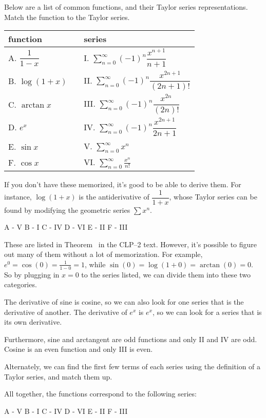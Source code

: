 \begin{Mquestion}
Below are a list of common functions, and their Taylor series representations. Match the function to the Taylor series.
\begin{center}
\begin{tabular}{l c l}
function & \qquad & series\\
\hline
A. $\dfrac{1}{1-x}$&&I. $\displaystyle\sum_{n=0}^\infty(-1)^n\dfrac{x^{n+1}}{n+1}$\\[20pt]
B. $\log(1+x)$&&II. $\displaystyle\sum_{n=0}^\infty(-1)^n\dfrac{x^{2n+1}}{(2n+1)!}$\\[20pt]
C. $\arctan x$&&III. $\displaystyle\sum_{n=0}^\infty(-1)^n\dfrac{x^{2n}}{(2n)!}$\\[20pt]
D. $e^x$&&IV. $\displaystyle\sum_{n=0}^\infty(-1)^n\dfrac{x^{2n+1}}{2n+1}$\\[20pt]
E. $\sin x$ &&V. $\displaystyle\sum_{n=0}^\infty x^n$\\[20pt]
F. $\cos x$ &&VI. $\displaystyle\sum_{n=0}^\infty \frac{x^n}{n!}$
\end{tabular}
\end{center}
\end{Mquestion}
\begin{hint}
If you don't have these memorized, it's good to be able to derive them. For instance, $\log(1+x)$ is the antiderivative of $\dfrac{1}{1+x}$, whose Taylor series can be found by modifying the geometric series $\sum x^n$.
\end{hint}
\begin{answer}
A - V \hfill
B - I \hfill
C - IV \hfill
D - VI \hfill
E - II \hfill
F - III
\end{answer}
\begin{solution}
These are listed in Theorem~ in the CLP--2 text. However, it's possible to figure out many of them without a lot of memorization. For example, $e^0=\cos(0)=\frac{1}{1-0}=1$, while $\sin(0)=\log(1+0)=\arctan(0)=0$. So by plugging in $x=0$ to the series listed, we can divide them into these two categories.

The derivative of sine is cosine, so we can also look for one series that is the derivative of another. The derivative of $e^x$ is $e^x$, so we can look for a series that is its own derivative.

Furthermore,      sine and arctangent are odd functions and only  II and IV are  odd.
Cosine is an even  function and only III is even.

Alternately, we can find the first few terms of each series using the definition of a Taylor series, and match them up.

All together, the functions correspond to the following series:

A - V \hfill
B - I \hfill
C - IV \hfill
D - VI \hfill
E - II \hfill
F - III

\end{solution}
